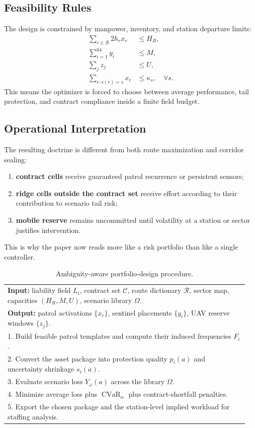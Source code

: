 \subsection{Feasibility Rules}
The design is constrained by manpower, inventory, and station departure limits:
\begin{align}
\sum_{r\in\mathcal{R}} 2h_r x_r &\le H_R, \label{eq:rangerhours}\\
\sum_{i=1}^{64} y_i &\le M, \label{eq:devices}\\
\sum_j z_j &\le U, \label{eq:drones}\\
\sum_{r:s(r)=s} x_r &\le \kappa_s,\quad \forall s. \label{eq:station}
\end{align}
This means the optimizer is forced to choose between average performance, tail protection, and contract compliance inside a finite field budget.

\subsection{Operational Interpretation}
The resulting doctrine is different from both route maximization and corridor sealing:
\begin{enumerate}
  \item \textbf{contract cells} receive guaranteed patrol recurrence or persistent sensors;
  \item \textbf{ridge cells outside the contract set} receive effort according to their contribution to scenario tail risk;
  \item \textbf{mobile reserve} remains uncommitted until volatility at a station or sector justifies intervention.
\end{enumerate}
This is why the paper now reads more like a risk portfolio than like a single controller.

\begin{table}[H]
\centering
\caption{Ambiguity-aware portfolio-design procedure.}
\label{alg:planner}
\begin{tabular}{p{0.95\linewidth}}
\toprule
\textbf{Input:} liability field \(L_i\), contract set \(\mathcal{C}\), route dictionary \(\mathcal{R}\), sector map, capacities \((H_R,M,U)\), scenario library \(\Omega\). \\
\textbf{Output:} patrol activations \(\{x_r\}\), sentinel placements \(\{y_i\}\), UAV reserve windows \(\{z_j\}\). \\
\midrule
1. Build feasible patrol templates and compute their induced frequencies \(F_i\). \\
2. Convert the asset package into protection quality \(p_i(a)\) and uncertainty shrinkage \(s_i(a)\). \\
3. Evaluate scenario loss \(Y_\omega(a)\) across the library \(\Omega\). \\
4. Minimize average loss plus \(\operatorname{CVaR}_\alpha\) plus contract-shortfall penalties. \\
5. Export the chosen package and the station-level implied workload for staffing analysis. \\
\bottomrule
\end{tabular}
\end{table}


